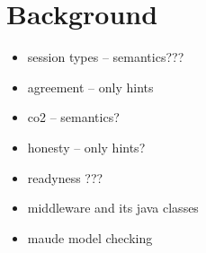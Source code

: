 
\section{Background}\label{sec:background}

\begin{itemize}
\item session types -- semantics???
\item agreement -- only hints
\item co2 -- semantics?
\item honesty -- only hints?
\item readyness ???
\item middleware and its java classes
\item maude model checking
\end {itemize}

